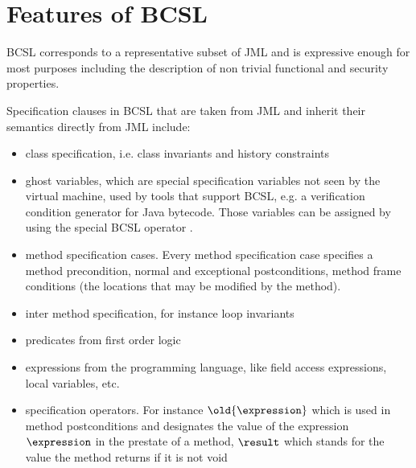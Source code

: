 

\section{Features of BCSL} \label{grammar}


BCSL corresponds to a representative subset of JML and is expressive enough for most purposes including the description of non trivial functional and 
 security properties.

 Specification clauses in BCSL that are taken from JML and inherit their semantics directly from JML include:
\begin{itemize}
   \item class specification, i.e. class invariants and history constraints
   \item ghost variables, which are special specification variables not seen by the virtual machine, used by tools that support BCSL,
    e.g. a verification condition generator for Java bytecode. Those variables can be assigned by using the special BCSL operator \set.
   \item  method specification cases. Every method specification case specifies
         a method precondition, normal and exceptional postconditions, method frame conditions (the locations that may be modified by the method).
	 
   \item inter method specification, for instance loop invariants
   \item predicates from first order logic   
      
   \item expressions from the programming language, like field access expressions, local variables, etc.
   
   \item specification operators. For instance  $\old{\expression}$ which is used in method postconditions and
 designates the value of the expression $\expression$ in the prestate of a method, $ \result$ which stands for the value the method
returns if it is not void  

\end{itemize}

